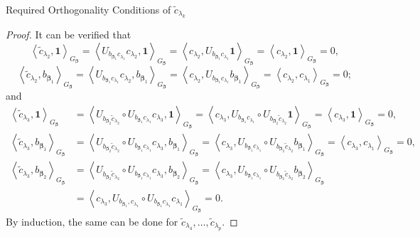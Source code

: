 \documentclass[11pt]{article}
\makeatletter
\newcommand\mysection{\@startsection {section}{1}{\z@}{-3.5ex \@plus -1ex \@minus -.2ex}{2.3ex \@plus.2ex}
{\normalfont\large\bfseries}}
\newcommand{\vect}[1]{\boldsymbol{#1}}
\newcommand{\inner}[1]{\left\langle #1 \right\rangle}
\makeatother
\begin{document}
\mysection{Required Orthogonality Conditions of \texorpdfstring{$\widetilde{c}_{\lambda_k}$}{TEXT}}  \label{App:orthor}
\begin{proof}
It can be verified that 
$$ \inner{
\widetilde{c}_{\lambda_{2}},\vect{1}}_{G_{\vect{\beta}}}= \inner{
U_{b_{\vect{\beta}_{1}}c_{\lambda_{1}}}
c_{\lambda_{2}},\vect{1}}_{G_{\vect{\beta}}} = \inner{c_{\lambda_{2}},U_{b_{\vect{\beta}_{1}}c_{\lambda_{1}}}\vect{1}}_{G_{\vect{\beta}}}=\inner{c_{\lambda_{2}},\vect{1}}_{G_{\vect{\beta}}}=0,$$
$$
\inner{
\widetilde{c}_{\lambda_{2}},b_{\vect{\beta}_1}}_{G_{\vect{\beta}}}= \inner{
U_{b_{\vect{\beta}_{1}}c_{\lambda_{1}}}
c_{\lambda_{2}},b_{\vect{\beta}_1}}_{G_{\vect{\beta}}} = \inner{c_{\lambda_{2}},U_{b_{\vect{\beta}_{1}}c_{\lambda_{1}}}b_{\vect{\beta}_1}}_{G_{\vect{\beta}}}=\inner{c_{\lambda_{2}},c_{\lambda_1}}_{G_{\vect{\beta}}}=0;$$
and
\begin{equation*}
\begin{split}
 \inner{
\widetilde{c}_{\lambda_{3}},\vect{1}}_{G_{\vect{\beta}}}&= \inner{
U_{b_{\vect{\beta}_{2}}\widetilde{c}_{\lambda_{2}}}\circ U_{b_{\vect{\beta}_{1}}c_{\lambda_{1}}}
c_{\lambda_{3}},\vect{1}}_{G_{\vect{\beta}}} = \inner{c_{\lambda_{3}},U_{b_{\vect{\beta}_{1}}c_{\lambda_{1}}}\circ U_{b_{\vect{\beta}_{2}}\widetilde{c}_{\lambda_{2}}}\vect{1}}_{G_{\vect{\beta}}}=\inner{c_{\lambda_{3}},\vect{1}}_{G_{\vect{\beta}}}=0,\\
\inner{
\widetilde{c}_{\lambda_{3}},b_{\vect{\beta}_{1}}}_{G_{\vect{\beta}}}&= \inner{U_{b_{\vect{\beta}_{2}}\widetilde{c}_{\lambda_{2}}}\circ U_{b_{\vect{\beta}_{1}}c_{\lambda_{1}}}c_{\lambda_{3}},b_{\vect{\beta}_1}}_{G_{\vect{\beta}}} = \inner{c_{\lambda_{3}},U_{b_{\vect{\beta}_{1}}c_{\lambda_{1}}}\circ U_{b_{\vect{\beta}_{2}}\widetilde{c}_{\lambda_{2}}}b_{\vect{\beta}_1}}_{G_{\vect{\beta}}}=\inner{c_{\lambda_{3}},c_{\lambda_1}}_{G_{\vect{\beta}}}=0,\\
\inner{
\widetilde{c}_{\lambda_{3}},b_{\vect{\beta}_{2}}}_{G_{\vect{\beta}}} &= \inner{U_{b_{\vect{\beta}_{2}}\widetilde{c}_{\lambda_{2}}}\circ U_{b_{\vect{\beta}_{1}}c_{\lambda_{1}}}c_{\lambda_{3}},b_{\vect{\beta}_2}}_{G_{\vect{\beta}}} = \inner{c_{\lambda_{3}},U_{b_{\vect{\beta}_{1}}c_{\lambda_{1}}}\circ U_{b_{\vect{\beta}_{2}}\widetilde{c}_{\lambda_{2}}}b_{\vect{\beta}_2}}_{G_{\vect{\beta}}}\\&
=\inner{c_{\lambda_{3}}, U_{b_{\vect{\beta}_{1}},c_{\lambda_1}}\circ U_{b_{\vect{\beta}_{1}}c_{\lambda_{1}}}c_{\lambda_1}}_{G_{\vect{\beta}}}=0.
\end{split}
\end{equation*}
By induction, the same can be done for $\widetilde{c}_{\lambda_4},\dots,\widetilde{c}_{\lambda_p}$.

\end{proof}


\newpage
\nocite*{}  


\end{document}
